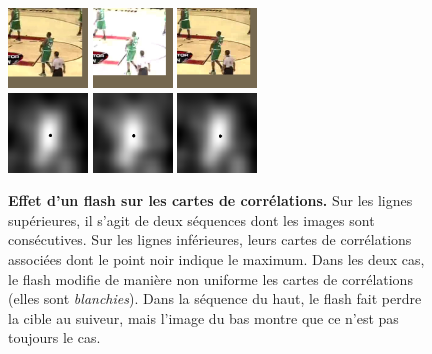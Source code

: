 \documentclass[10pt,twocolumn,letterpaper,french]{article}
\begin{document}
\begin{figure}[!h]
  \includegraphics[width=60pt]{images/vids/basketflash/700/000699.png}
  \includegraphics[width=60pt]{images/vids/basketflash/700/000700.png}
  \includegraphics[width=60pt]{images/vids/basketflash/700/000701.png}\\
  \includegraphics[width=60pt]{images/vids/basketflash/700/corr/000699.png}
  \includegraphics[width=60pt]{images/vids/basketflash/700/corr/000700.png}
  \includegraphics[width=60pt]{images/vids/basketflash/700/corr/000701.png} 
  \caption{\textbf{Effet d'un flash sur les cartes de corrélations.} Sur les lignes supérieures, il s'agit de deux séquences dont les images sont consécutives. Sur les lignes inférieures, leurs cartes de corrélations associées dont le point noir indique le maximum. Dans les deux cas, le flash modifie de manière non uniforme les cartes de corrélations (elles sont \textit{blanchies}). Dans la séquence du haut, le flash fait perdre la cible au suiveur, mais l'image du bas montre que ce n'est pas toujours le cas. }
  \label{flash}
  \end{figure}
\end{document}
